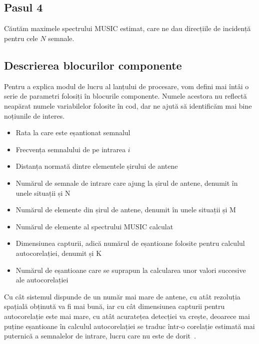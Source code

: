 \subsection*{Pasul 4}
\label{sssec:step4}
Căutăm maximele spectrului MUSIC estimat, care ne dau direcțiile de incidență
pentru cele $\hat{N}$ semnale.


\subsection{Descrierea blocurilor componente}
\label{ssec:gr-doa-desc-blocks}

Pentru a explica modul de lucru al lanțului de procesare, vom defini mai întâi o
serie de parametri folosiți în blocurile componente. Numele acestora nu reflectă
neapărat numele variabilelor folosite în cod, dar ne ajută să identificăm mai
bine noțiunile de interes.

\begin{itemize}
  \item {} Rata la care este eșantionat semnalul
  \item {} Frecvența semnalului de pe intrarea $i$
  \item {} Distanța normată dintre elementele șirului de
  antene
  \item {} Numărul de semnale de intrare care ajung la șirul de
  antene, denumit în unele situații și N
  \item {} Numărul de elemente din șirul de antene,
  denumit în unele situații și M
  \item {} Numărul de elemente al spectrului MUSIC calculat
  \item {} Dimensiunea capturii, adică numărul de eșantioane
  folosite pentru calculul autocorelației, denumit și K
  \item {} Numărul de eșantioane care se suprapun la
  calcularea unor valori succesive ale autocorelației
\end{itemize}

Cu cât sistemul dispunde de un număr mai mare de antene, cu atât rezoluția
spațială obținută va fi mai bună, iar cu cât dimensiunea capturii pentru autocorelație
este mai mare, cu atât acuratețea detecției va crește, deoarece mai puține
eșantioane în calculul autocorelației se traduc într-o corelație estimată mai
puternică a semnalelor de intrare, lucru care nu este de dorit~\cite{oumar2012comparison}.

